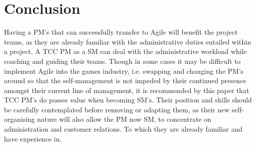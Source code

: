 \documentclass{scrartcl}
\begin{document}
\section{Conclusion}

Having a PM's that can successfully transfer to Agile will benefit the project teams, as they are already familiar with the administrative duties entailed within a project. A TCC PM as a SM can deal with the administrative workload while coaching and guiding their teams. Though in some cases it may be difficult to implement Agile into the games industry, i.e. swapping and changing the PM's around so that the self-management is not impeded by their continued presence amongst their current line of management, it is recommended by this paper that TCC PM's do posses value when becoming SM's. Their position and skills should be carefully contemplated before removing or adapting them, as their new self-organising nature will also allow the PM now SM, to concentrate on administration and customer relations. To which they are already familiar and have experience in.



\end{document}
